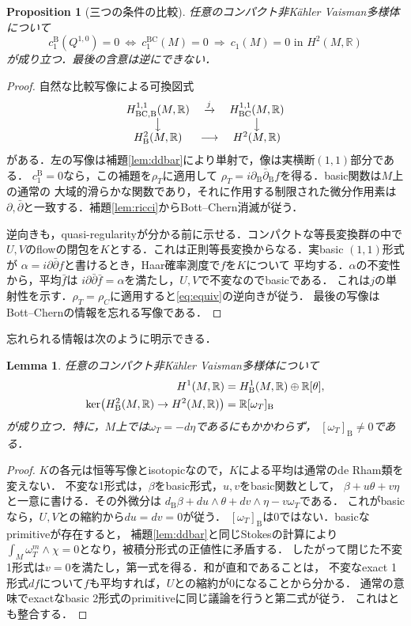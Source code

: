 \documentclass[12pt]{amsart}
\newtheorem{prop}[thm]{Proposition}
\newtheorem{lem}[thm]{Lemma}
\theoremstyle{definition}
\theoremstyle{remark}
\numberwithin{equation}{section}
\newcommand{\R}{\mathbb{R}}
\newcommand{\BC}{\mathrm{BC}}
\newcommand{\bas}{\mathrm{B}}
\newcommand{\wt}{\omega_{T}}
\newcommand{\rhoT}{\rho_{T}}
\newcommand{\rhoC}{\rho_{C}}
\begin{document}
\begin{prop}[三つの条件の比較]\label{prop:bridge}
任意のコンパクト非K\"ahler Vaisman多様体について
\begin{equation}\label{eq:equiv}
c_1^{\bas}(Q^{1,0})=0
\ \Longleftrightarrow\ c_1^{\BC}(M)=0
\ \Longrightarrow\ c_1(M)=0\text{ in }H^2(M,\R)
\end{equation}
が成り立つ．最後の含意は逆にできない．
\end{prop}
\begin{proof}
自然な比較写像による可換図式
\[
\begin{array}{ccc}
H_{\BC,\bas}^{1,1}(M,\R)&\xrightarrow{j}&H_{\BC}^{1,1}(M,\R)\\
\big\downarrow&&\big\downarrow\\
H_{\bas}^{2}(M,\R)&\longrightarrow&H^{2}(M,\R)
\end{array}
\]
がある．左の写像は補題\ref{lem:ddbar}により単射で，像は実横断$(1,1)$部分である．
$c_1^{\bas}=0$なら，この補題を$\rhoT$に適用して
$\rhoT=i\partial_{\bas}\bar\partial_{\bas}f$を得る．basic関数は$M$上の通常の
大域的滑らかな関数であり，それに作用する制限された微分作用素は
$\partial,\bar\partial$と一致する．補題\ref{lem:ricci}からBott--Chern消滅が従う．

逆向きも，quasi-regularityが分かる前に示せる．コンパクトな等長変換群の中で
$U,V$のflowの閉包を$K$とする．これは正則等長変換からなる．実basic $(1,1)$形式が
$\alpha=i\partial\bar\partial f$と書けるとき，Haar確率測度で$f$を$K$について
平均する．$\alpha$の不変性から，平均$\bar f$は
$i\partial\bar\partial\bar f=\alpha$を満たし，$U,V$で不変なのでbasicである．
これは$j$の単射性を示す．$\rhoT=\rhoC$に適用すると\eqref{eq:equiv}の逆向きが従う．
最後の写像はBott--Chernの情報を忘れる写像である．
\end{proof}

忘れられる情報は次のように明示できる．
\begin{lem}\label{lem:lowdegree}
任意のコンパクト非K\"ahler Vaisman多様体について
\begin{align}\label{eq:lowdegree}
H^1(M,\R)&=H^1_{\bas}(M,\R)\oplus\R[\theta],\\
\ker\bigl(H^2_{\bas}(M,\R)\to H^2(M,\R)\bigr)&=\R[\wt]_{\bas}
\notag
\end{align}
が成り立つ．特に，$M$上では$\wt=-d\eta$であるにもかかわらず，
$[\wt]_{\bas}\ne0$である．
\end{lem}
\begin{proof}
$K$の各元は恒等写像とisotopicなので，$K$による平均は通常のde Rham類を変えない．
不変な1形式は，$\beta$をbasic形式，$u,v$をbasic関数として，
$\beta+u\theta+v\eta$と一意に書ける．その外微分は
$d_{\bas}\beta+du\wedge\theta+dv\wedge\eta-v\wt$である．
これがbasicなら，$U,V$との縮約から$du=dv=0$が従う．
$[\wt]_{\bas}$は0ではない．basicなprimitiveが存在すると，
補題\ref{lem:ddbar}と同じStokesの計算により
$\int_M\wt^m\wedge\chi=0$となり，被積分形式の正値性に矛盾する．
したがって閉じた不変1形式は$v=0$を満たし，第一式を得る．和が直和であることは，
不変なexact 1形式$df$について$f$も平均すれば，$U$との縮約が0になることから分かる．
通常の意味でexactなbasic 2形式のprimitiveに同じ議論を行うと第二式が従う．
これは\cite[Sections 3--5]{IO}とも整合する．
\end{proof}
\end{document}
